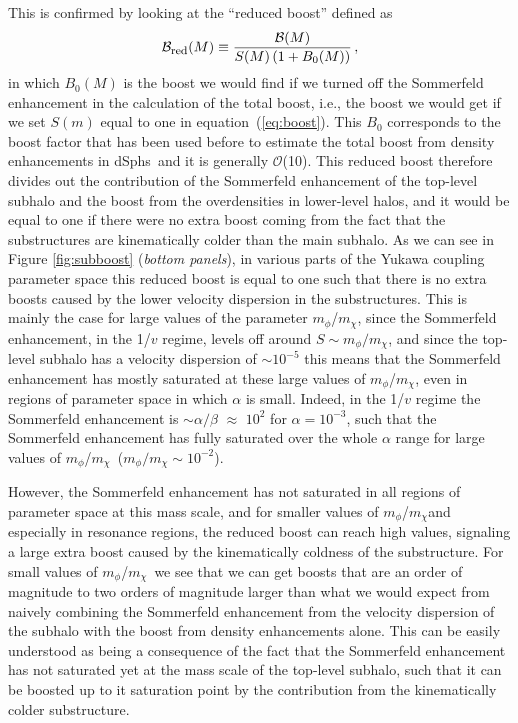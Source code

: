 \documentclass[aps,prd,twocolumn,amsmath,amssymb,floatfix,nofootinbib,10pt]{revtex4}
\newcommand{\ie}{i.e.}
\newcommand{\somm}{\ensuremath{S}}
\newcommand{\mdm}{\ensuremath{m_{\chi}}}
\newcommand{\mv}{\ensuremath{m_{\phi}}}
\newcommand{\eqnname}{equation}
\newcommand{\order}{\ensuremath{\mathcal{O}}}
\newcommand{\boost}{\ensuremath{B}}
\newcommand{\redboost}{\ensuremath{\mathcal{B}_{\mbox{{\footnotesize red}}}}}
\newcommand{\totalboost}{\ensuremath{\mathcal{B}}}
\newcommand{\dSphs}{dSphs}
\begin{document}
This is confirmed by looking at the ``reduced boost'' defined as
\begin{equation}\label{eq:redboost}
\redboost(M) \equiv \frac{\totalboost(M)}{\somm(M)\left(1+\boost_0(M)\right)}\, ,
\end{equation}
in which $\boost_0(M)$ is the boost we would find if we turned off the
Sommerfeld enhancement in the calculation of the total boost, \ie, the
boost we would get if we set $\somm(m)$ equal to one in \eqnname\
(\ref{eq:boost}). This $\boost_0$ corresponds to the boost factor that
has been used before to estimate the total boost from density
enhancements in \dSphs\ and it is generally \order(10). This reduced
boost therefore divides out the contribution of the Sommerfeld
enhancement of the top-level subhalo and the boost from the
overdensities in lower-level halos, and it would be equal to one if
there were no extra boost coming from the fact that the substructures
are kinematically colder than the main subhalo. As we can see in
Figure \ref{fig:subboost} (\emph{bottom panels}), in various parts of
the Yukawa coupling parameter space this reduced boost is equal to one
such that there is no extra boosts caused by the lower velocity
dispersion in the substructures. This is mainly the case for large
values of the parameter \mv/\mdm, since the Sommerfeld enhancement, in
the 1/$v$ regime, levels off around $\somm \sim \mv/\mdm$, and since
the top-level subhalo has a velocity dispersion of $\sim 10^{-5}$ this
means that the Sommerfeld enhancement has mostly saturated at these
large values of \mv/\mdm, even in regions of parameter space in which
$\alpha$ is small. Indeed, in the 1/$v$ regime the Sommerfeld
enhancement is $\sim \alpha/\beta$ $\approx$ $10^{2}$ for $\alpha =
10^{-3}$, such that the Sommerfeld enhancement has fully saturated
over the whole $\alpha$ range for large values of \mv/\mdm\ ($\mv/\mdm
\sim 10^{-2}$).


However, the Sommerfeld enhancement has not saturated in all regions
of parameter space at this mass scale, and for smaller values of
\mv/\mdm and especially in resonance regions, the reduced boost can
reach high values, signaling a large extra boost caused by the
kinematically coldness of the substructure.  For small values of
\mv/\mdm\ we see that we can get boosts that are an order of magnitude
to two orders of magnitude larger than what we would expect from
naively combining the Sommerfeld enhancement from the velocity
dispersion of the subhalo with the boost from density enhancements
alone. This can be easily understood as being a consequence of the
fact that the Sommerfeld enhancement has not saturated yet at the mass
scale of the top-level subhalo, such that it can be boosted up to it
saturation point by the contribution from the kinematically colder
substructure.
\end{document}
